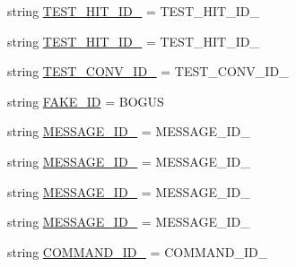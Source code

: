 \begin{DoxyCompactItemize}
string \hyperlink{namespaceparlai_1_1mturk_1_1core_1_1legacy__2018_1_1test_1_1test__full__system_a798fd36547cef77e800f7e3ae309b3f2}{T\+E\+S\+T\+\_\+\+H\+I\+T\+\_\+\+I\+D\+\_} = \textquotesingle{}T\+E\+S\+T\+\_\+\+H\+I\+T\+\_\+\+I\+D\+\_\textquotesingle{}
\item 
string \hyperlink{namespaceparlai_1_1mturk_1_1core_1_1legacy__2018_1_1test_1_1test__full__system_aa2fe7920a26a5cccb1f5060ef5c6ae3f}{T\+E\+S\+T\+\_\+\+H\+I\+T\+\_\+\+I\+D\+\_} = \textquotesingle{}T\+E\+S\+T\+\_\+\+H\+I\+T\+\_\+\+I\+D\+\_\textquotesingle{}
\item 
string \hyperlink{namespaceparlai_1_1mturk_1_1core_1_1legacy__2018_1_1test_1_1test__full__system_a4fbedfd1cc8d3caa89fd35bb878023a0}{T\+E\+S\+T\+\_\+\+C\+O\+N\+V\+\_\+\+I\+D\+\_} = \textquotesingle{}T\+E\+S\+T\+\_\+\+C\+O\+N\+V\+\_\+\+I\+D\+\_\textquotesingle{}
\item 
string \hyperlink{namespaceparlai_1_1mturk_1_1core_1_1legacy__2018_1_1test_1_1test__full__system_a84636d0b8606c16ed2ad9b966990d62b}{F\+A\+K\+E\+\_\+\+ID} = \textquotesingle{}B\+O\+G\+US\textquotesingle{}
\item 
string \hyperlink{namespaceparlai_1_1mturk_1_1core_1_1legacy__2018_1_1test_1_1test__full__system_ab2e629b52ba8a40c73d267595af641c9}{M\+E\+S\+S\+A\+G\+E\+\_\+\+I\+D\+\_} = \textquotesingle{}M\+E\+S\+S\+A\+G\+E\+\_\+\+I\+D\+\_\textquotesingle{}
\item 
string \hyperlink{namespaceparlai_1_1mturk_1_1core_1_1legacy__2018_1_1test_1_1test__full__system_a3d181db05ff821f584e0cb09c74d3e25}{M\+E\+S\+S\+A\+G\+E\+\_\+\+I\+D\+\_} = \textquotesingle{}M\+E\+S\+S\+A\+G\+E\+\_\+\+I\+D\+\_\textquotesingle{}
\item 
string \hyperlink{namespaceparlai_1_1mturk_1_1core_1_1legacy__2018_1_1test_1_1test__full__system_a9fac31f3b63111dead80334f4aee5c9c}{M\+E\+S\+S\+A\+G\+E\+\_\+\+I\+D\+\_} = \textquotesingle{}M\+E\+S\+S\+A\+G\+E\+\_\+\+I\+D\+\_\textquotesingle{}
\item 
string \hyperlink{namespaceparlai_1_1mturk_1_1core_1_1legacy__2018_1_1test_1_1test__full__system_a96fba8971c9ad9569be35e585824a14c}{M\+E\+S\+S\+A\+G\+E\+\_\+\+I\+D\+\_} = \textquotesingle{}M\+E\+S\+S\+A\+G\+E\+\_\+\+I\+D\+\_\textquotesingle{}
\item 
string \hyperlink{namespaceparlai_1_1mturk_1_1core_1_1legacy__2018_1_1test_1_1test__full__system_a70f7607051cb226df4b54f4632edaa5b}{C\+O\+M\+M\+A\+N\+D\+\_\+\+I\+D\+\_} = \textquotesingle{}C\+O\+M\+M\+A\+N\+D\+\_\+\+I\+D\+\_\textquotesingle{}

\end{DoxyCompactItemize}
